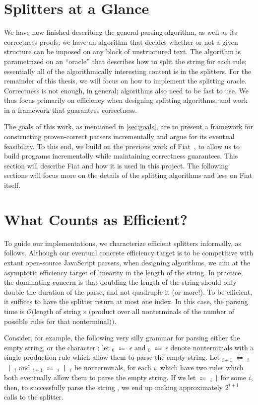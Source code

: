\section{Splitters at a Glance}
  We have now finished describing the general parsing algorithm, as well as its correctness proofs; we have an algorithm that decides whether or not a given structure can be imposed on any block of unstructured text.  The algorithm is parametrized on an ``oracle'' that describes how to split the string for each rule; essentially all of the algorithmically interesting content is in the splitters.  For the remainder of this thesis, we will focus on how to implement the splitting oracle.  Correctness is not enough, in general; algorithms also need to be fast to use.  We thus focus primarily on efficiency when designing splitting algorithms, and work in a framework that guarantees correctness.
  
  The goals of this work, as mentioned in \autoref{sec:goals}, are to present a framework for constructing proven-correct parsers incrementally and argue for its eventual feasibility.  To this end, we build on the previous work of Fiat~\cite{fiat}, to allow us to build programs incrementally while maintaining correctness guarantees.  This section will describe Fiat and how it is used in this project.  The following sections will focus more on the details of the splitting algorithms and less on Fiat itself.
  
\section{What Counts as Efficient?}
  To guide our implementations, we characterize efficient splitters informally, as follows.  Although our eventual concrete efficiency target is to be competitive with extant open-source JavaScript parsers, when designing algorithms, we aim at the asymptotic efficiency target of linearity in the length of the string.  In practice, the dominating concern is that doubling the length of the string should only double the duration of the parse, and not quadruple it (or more!).  %
  To be efficient, it suffices to have the splitter return at most one index.  In this case, the parsing time is $\mathcal O($length of string${} \times ($product over all nonterminals of the number of possible rules for that nonterminal$))$.
    
  Consider, for example, the following very silly grammar for parsing either the empty string, or the character : let $_{0}$ $\Coloneqq$ $\epsilon$ and $_{0}$ $\Coloneqq$ $\epsilon$ denote nonterminals with a single production rule which allow them to parse the empty string.  Let $_{i+1}$ $\Coloneqq$ $_i$~\texttt{|}~$_i$ and $_{i+1}$ $\Coloneqq$ $_i$~\texttt{|}~$_i$ be nonterminals, for each $i$, which have two rules which both eventually allow them to parse the empty string.  If we let  $\Coloneqq$ $_{i}$ \texttt{|}  for some $i$, then, to successfully parse the string , we end up making approximately $2^{i+1}$ calls to the splitter.

